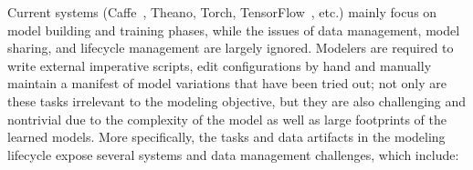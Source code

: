 \documentclass[conference]{IEEEtran}
\begin{document}
Current systems (Caffe~\cite{caffe2014mm}, Theano, Torch, TensorFlow~\cite{tensorflow}, etc.) mainly focus on model building and training phases, while the issues of data management, model sharing, and lifecycle management are largely ignored. Modelers are required to write external imperative scripts, edit configurations by hand and manually maintain a manifest of model variations that have been tried out; not only are these tasks irrelevant to the modeling objective, but they are also challenging and nontrivial due to the complexity of the model as well as large footprints of the learned models. More specifically, the tasks and data artifacts in the modeling lifecycle expose several systems and data management challenges, which include:
\end{document}
